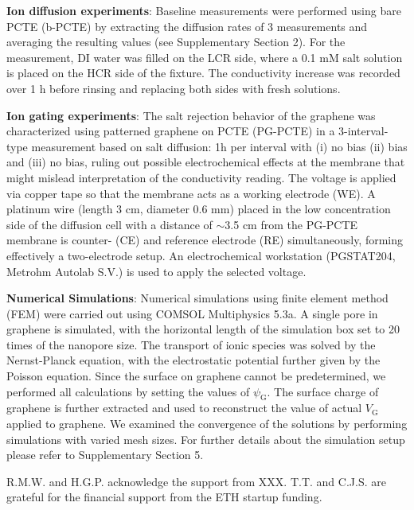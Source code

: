 \documentclass[journal=langd5,email=true, hyperref=true, keywords=false]{achemso}
\begin{document}
\vspace{1em}
\noindent
\textbf{Ion diffusion experiments}: Baseline measurements were
performed using bare PCTE (b-PCTE) by extracting the diffusion rates
of 3 measurements and averaging the resulting values (see
Supplementary Section 2). For the measurement, DI water was filled on
the LCR side, where a 0.1 mM salt solution is placed on the HCR side
of the fixture. The conductivity increase was recorded over 1 h before
rinsing and replacing both sides with fresh solutions.

\vspace{1em}
\noindent
\textbf{Ion gating experiments}: The salt rejection behavior of the graphene
was characterized using patterned graphene on PCTE (PG-PCTE) in a
3-interval-type measurement based on salt diffusion: 1h per interval
with (i) no bias (ii) bias and (iii) no bias, ruling out possible
electrochemical effects at the membrane that might mislead
interpretation of the conductivity reading. The voltage is applied via
copper tape so that the membrane acts as a working electrode (WE). A
platinum wire (length 3 cm, diameter 0.6 mm) placed in the low
concentration side of the diffusion cell with a distance of $\sim$3.5 cm
from the PG-PCTE membrane is counter- (CE) and reference electrode
(RE) simultaneously, forming effectively a two-electrode setup. An
electrochemical workstation (PGSTAT204, Metrohm Autolab S.V.) is used
to apply the selected voltage.

\vspace{1em}
\noindent
\textbf{Numerical Simulations}: Numerical simulations using finite
element method (FEM) were carried out using COMSOL Multiphysics
5.3a. A single pore in graphene is simulated, with the horizontal
length of the simulation box set to 20 times of the nanopore size. The
transport of ionic species was solved by the Nernst-Planck equation,
with the electrostatic potential further given by the Poisson
equation. Since the surface on graphene cannot be predetermined, we
performed all calculations by setting the values of
$\psi_{\mathrm{G}}$. The surface charge of graphene is further
extracted and used to reconstruct the value of actual $V_{\mathrm{G}}$
applied to graphene. We examined the convergence of the solutions by
performing simulations with varied mesh sizes. For further details
about the simulation setup please refer to Supplementary Section 5.


\begin{acknowledgement}
 R.M.W. and H.G.P. acknowledge the support from
XXX. T.T. and C.J.S. are grateful for the financial support from the
ETH startup funding.
\end{acknowledgement}
\end{document}
